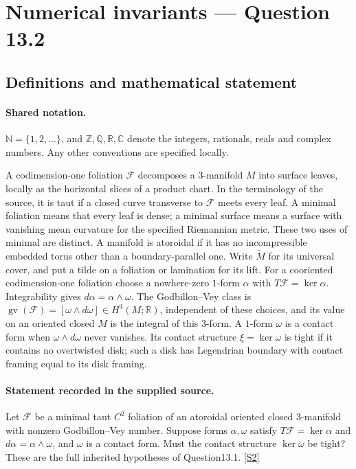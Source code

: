 \documentclass[11pt]{article}
\newcommand{\sref}[2]{\hyperlink{source:#1:#2}{[S#2]}}
\begin{document}
\section{Numerical invariants — Question 13.2}\label{statement}

\subsection{Definitions and mathematical statement}

\paragraph{Shared notation.}$\mathbb N=\{1,2,\ldots\}$, and $\mathbb Z,\mathbb Q,\mathbb R,\mathbb C$ denote the integers, rationals, reals and complex numbers. Any other conventions are specified locally.


A codimension-one foliation $\mathcal F$ decomposes a $3$-manifold $M$ into surface leaves, locally as the horizontal slices of a product chart. In the terminology of the source, it is taut if a closed curve transverse to $\mathcal F$ meets every leaf. A minimal foliation means that every leaf is dense; a minimal surface means a surface with vanishing mean curvature for the specified Riemannian metric. These two uses of minimal are distinct. A manifold is atoroidal if it has no incompressible embedded torus other than a boundary-parallel one. Write $\widetilde M$ for its universal cover, and put a tilde on a foliation or lamination for its lift. For a cooriented codimension-one foliation choose a nowhere-zero $1$-form $\alpha$ with $T\mathcal F=\ker\alpha$. Integrability gives $d\alpha=\alpha\wedge\omega$. The Godbillon--Vey class is $\operatorname{gv}(\mathcal F)=[\omega\wedge d\omega]\in H^3(M;\mathbb R)$, independent of these choices, and its value on an oriented closed $M$ is the integral of this $3$-form. A $1$-form $\omega$ is a contact form when $\omega\wedge d\omega$ never vanishes. Its contact structure $\xi=\ker\omega$ is tight if it contains no overtwisted disk; such a disk has Legendrian boundary with contact framing equal to its disk framing.
\paragraph{Statement recorded in the supplied source.}
Let $\mathcal F$ be a minimal taut $C^2$ foliation of an atoroidal oriented closed $3$-manifold with nonzero Godbillon--Vey number. Suppose forms $\alpha,\omega$ satisfy $T\mathcal F=\ker\alpha$ and $d\alpha=\alpha\wedge\omega$, and $\omega$ is a contact form. Must the contact structure $\ker\omega$ be tight? These are the full inherited hypotheses of Question13.1. \sref{statement}{2}
\end{document}
